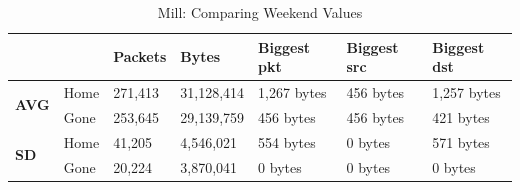 \begin{table}[H]
    \caption{Mill: Comparing Weekend Values}
    \begin{tabular}{ll|l|l|l|l|l|}
        \cline{3-7}
        \textbf{}                                           & \textbf{} & \textbf{Packets} & \textbf{Bytes} & \textbf{Biggest pkt} & \textbf{Biggest src} & \textbf{Biggest dst} \\ \hline
        \multicolumn{1}{|l|}{\multirow{2}{*}{\textbf{AVG}}} & Home      & 271,413          & 31,128,414     & 1,267 bytes          & 456 bytes            & 1,257 bytes          \\ \cline{2-7} 
        \multicolumn{1}{|l|}{}                              & Gone      & 253,645          & 29,139,759     & 456 bytes            & 456 bytes            & 421 bytes            \\ \hline
        \multicolumn{1}{|l|}{\multirow{2}{*}{\textbf{SD}}}  & Home      & 41,205           & 4,546,021      & 554 bytes            & 0 bytes              & 571 bytes            \\ \cline{2-7} 
        \multicolumn{1}{|l|}{}                              & Gone      & 20,224           & 3,870,041      & 0 bytes              & 0 bytes              & 0 bytes              \\ \hline
    \end{tabular}
    \label{tab:MillWeekends}
\end{table}

